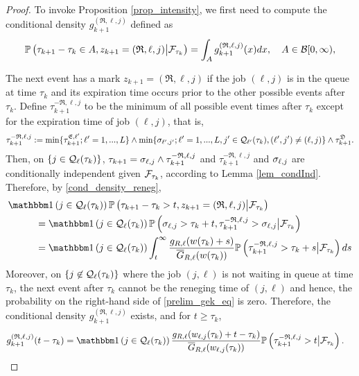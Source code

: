 \documentclass{article}
\theoremstyle{definition}
\numberwithin{equation}{section}
\begin{document}
\begin{proof}
To invoke Proposition \ref{prop_intensity}, we first need to compute the conditional density $g^{(\mathfrak{R},\ell,j)}_{k+1}$ defined as
\begin{equation}\label{prelim_gek_eq}
\mathbb{P}\left(\tau_{k+1}-\tau_{k}\in A, z_{k+1}=(\mathfrak{R},\ell,j)\big|\mathcal{F}_{\tau_k}\right)= \int_A g^{(\mathfrak{R},\ell,j)}_{k+1}(x) dx,\quad  A\in\mathcal{B}[0,\infty),
\end{equation}


The next event has a mark $ z_{k+1}=(\mathfrak{R},\ell,j)$ if the job $(\ell,j)$ is in the queue at time $\tau_k$ and its expiration time occurs prior to the other possible events after $\tau_k$. Define $\tau_{k+1}^{-\mathfrak{R},\ell,j}$ to be the minimum of all possible event times after $\tau_k$ except for the expiration time of job $(\ell,j)$, that is,
\[
  \tau_{k+1}^{-\mathfrak{R},\ell,j} := \min\{\tau^{\mathfrak{E},\ell'}_{k+1};\ell'=1,...,L\} \wedge \min\{\sigma_{\ell',j'}; \ell'=1,...,L,j'\in\mathcal{Q}_{\ell'}(\tau_k), (\ell',j')\neq (\ell,j) \} \wedge \tau^{\mathfrak{D}}_{k+1}.
\]
Then, on $\{j\in\mathcal{Q}_\ell(\tau_k)\}$, $\tau_{k+1}= \sigma_{\ell,j} \wedge \tau_{k+1}^{-\mathfrak{R},\ell,j}$ and $\tau_{k+1}^{-\mathfrak{R},\ell,j}$ and $\sigma_{\ell,j}$ are conditionally independent given $\mathcal{F}_{\tau_k}$, according to Lemma \ref{lem_condInd}. Therefore, by \eqref{cond_density_reneg},
\begin{align}\label{prelim_gtemp1}
&\indic{j\in\inque_\ell(\tau_k)}\Prob{\tau_{k+1}-\tau_{k}>t, z_{k+1}=(\mathfrak{R},\ell,j)\big|\filt_{\tau_k}} \notag\\ &\hspace{1cm}=\indic{j\in\inque_\ell(\tau_k)} \Prob{\renegtime_{\ell,j}>\tau_k+t,\tau_{k+1}^{-\mathfrak{R},\ell,j}>\renegtime_{\ell,j} \big|\filt_{\tau_k}}\notag\\
&\hspace{1cm}=\indic{j\in\inque_\ell(\tau_k)} \int_t^\infty \frac{g_{R,\ell}(\waiting(\tau_k)+s)} {\overline G_{R,\ell}(\waiting(\tau_k))} \Prob{\tau_{k+1}^{-\mathfrak{R},\ell,j}>\tau_k+s\big|\filt_{\tau_k}}ds
\end{align}
Moreover, on $\{j\not \in\mathcal{Q}_\ell(\tau_k)\}$ where the job $(j,\ell)$ is not waiting in queue at time $\tau_k$, the next event after $\tau_k$ cannot be the reneging time of $(j,\ell)$ and hence, the probability on the right-hand side of \eqref{prelim_gek_eq} is zero. Therefore, the conditional density $g^{(\mathfrak{R},\ell,j)}_{k+1}$ exists, and for $t\geq \tau_k$,
\begin{align}\label{prelim_gE}
  g^{(\mathfrak{R},\ell,j)}_{k+1}(t-\tau_k)& = \indic{j\in\inque_\ell(\tau_k)} \frac{g_{R,\ell}(\waiting_{\ell,j}(\tau_k)+t-\tau_k)} {\overline G_{R,\ell}(\waiting_{\ell,j}(\tau_k))} \Prob{\tau_{k+1}^{-\mathfrak{R},\ell,j}>t\big|\filt_{\tau_k}}.
\end{align}


\end{proof}
\end{document}
